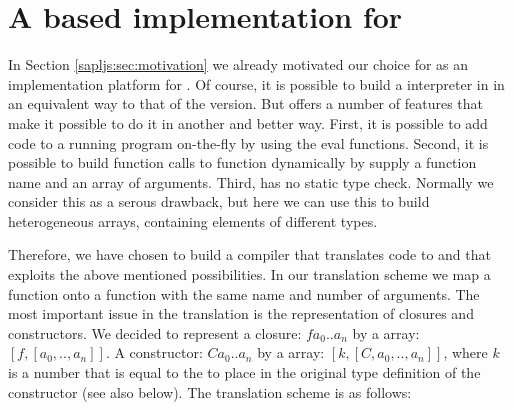 \section{A \JS based implementation for  \Sapl}\label{sapljs:sec:sapljs}
In Section \ref{sapljs:sec:motivation} we already motivated our choice for \JS as an implementation platform for \Sapl.
Of course, it is possible to build a \Sapl interpreter in \JS in an equivalent way to that of the \Java version.
But \JS offers a number of features that make it possible to do it in another and better way.
First, it is possible to add \JS code to a running \JS program on-the-fly by using the \textsf{eval} functions.
Second, it is possible to build function calls to \JS function dynamically by supply a function name and an array of arguments.
Third, \JS has no static type check. Normally we consider this as a serous drawback, but here we can use this to build heterogeneous arrays,
containing elements of different types.

Therefore, we have chosen to build a compiler that translates \Sapl code to \JS and that exploits the above mentioned possibilities.
In our translation scheme we map a \Sapl function onto a \JS function with the same name and number of arguments.
The most important issue in the translation is the representation of closures and constructors.
We decided to represent a closure: $f a_0 .. a_n$ by a \JS array: $[f,[a_0, .. ,a_n]]$.
A constructor:  $C a_0 .. a_n$ by a \JS array: $[k,[C,a_0, .. ,a_n]]$, where $k$ is a number that is equal to the 
to place in the original type definition of the constructor (see also below).
The translation scheme is as follows:

